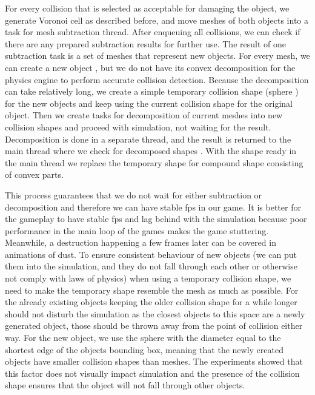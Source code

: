 For every collision that is selected as acceptable for damaging the object, we generate Voronoi cell as described before, and move meshes of both objects into a task for mesh subtraction thread. After enqueuing all collisions, we can  check if there are any prepared subtraction results for further use. The result of one subtraction task is a set of meshes that represent new objects. For every mesh, we can create a new object , but we do not have its convex decomposition for the physics engine to perform accurate collision detection. Because the decomposition can take relatively long, we create a simple temporary collision shape (\eg sphere ) for the new objects and keep using the current  collision shape for the original object. Then we create tasks for decomposition of current meshes into new collision shapes and proceed with simulation, not waiting for the result. Decomposition is done in a separate thread, and the result is returned to the main thread where we check for decomposed shapes . With the shape ready in the main thread we replace the temporary shape for compound shape consisting of convex parts.

This process guarantees that we do not wait for either subtraction or decomposition and therefore we can have stable fps in our game.  It is better for the gameplay to have stable fps and lag behind with the simulation because poor performance in the main loop of the games makes the game stuttering. Meanwhile, a destruction happening a few frames later can be covered in animations of dust. To ensure consistent behaviour of new objects (we can put them into the simulation, and they do not fall through each other or otherwise not comply with laws of physics) when using a temporary collision shape, we need to make the temporary shape resemble the mesh as much as possible.  For the already existing objects keeping the older collision shape for a while longer should not disturb the simulation as the closest objects to this space are a newly generated object, those should be thrown away from the point of collision either way. For the new object, we use the sphere with the diameter equal to the shortest edge of the objects bounding box, meaning that the newly created objects have smaller collision shapes than meshes. The experiments showed that this factor does not visually impact simulation and the presence of the collision shape ensures that the object will not fall through other objects. 


